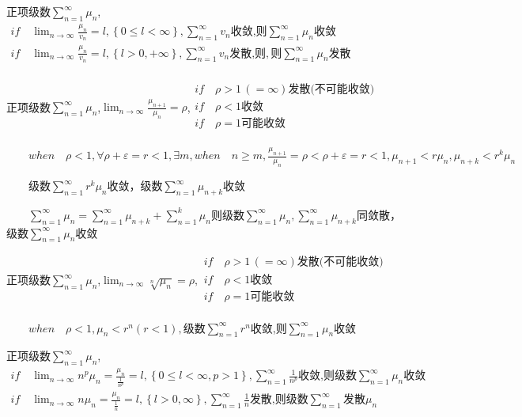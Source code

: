 \documentclass[UTF8]{ctexart}
\newcommand{\mt}[1]{\text{#1}}
\newcommand{\md}[1]{\displaystyle{#1}}
\newcommand{\mda}[1]{$\displaystyle{ #1 }$}
\newcommand{\mf}[1]{\left( #1\right)}
\newcommand{\mfb}[1]{\left\{ #1\right\}}
\newcommand{\q}{\quad}
\newcommand{\ma}[1]{\begin{array}{llll} #1 \end{array}}
\begin{document}
正项级数\mda{\sum_{n=1}^\infty\mu_n},\mda{\ma{
    if \q \lim_{n \rightarrow \infty}\frac{\mu_n}{v_n}=l,\mfb{0\leqslant l < \infty}, {\sum_{n=1}^\infty v_n}\mt{收敛,则} {\sum_{n=1}^\infty \mu_n}\mt{收敛}\\
    if \q \lim_{n \rightarrow \infty}\frac{\mu_n}{v_n}=l,\mfb{l>0,+\infty},{\sum_{n=1}^\infty v_n}\mt{发散,则},则{\sum_{n=1}^\infty \mu_n}\mt{发散}\\
}}

正项级数\mda{\sum_{n=1}^\infty\mu_n},\mda{\lim_{n \rightarrow \infty}\frac{\mu_{n+1}}{\mu_n}=\rho},$\ma{
    if \q \rho >1 \,\mf{=\infty} \mt{发散(不可能收敛)}\\
    if \q \rho <1 \mt{收敛}\\
    if \q \rho =1 \mt{可能收敛}\\
}$



$\q \q when  \q \rho <1 ,\forall \rho + \varepsilon=r<1,\exists m,when \q n\geqslant m,\frac{\mu_{n+1}}{\mu_n}=\rho<\rho+\varepsilon=r<1,{\mu_{n+1}}<r{\mu_n},{\mu_{n+k}}<r^k{\mu_n}$

$\q \q  $级数$\sum_{n=1}^\infty r^k\mu_n$收敛，级数$\sum_{n=1}^\infty \mu_{n+k}$收敛

$\q \q \md{\sum _{n=1}^\infty \mu_n =\sum _{n=1}^\infty \mu_{n+k} + \sum _{n=1}^k\mu_n}$则级数$\sum _{n=1}^\infty \mu_n ,\sum _{n=1}^\infty \mu_{n+k}$同敛散，级数$\sum_{n=1}^\infty \mu_{n}$收敛


正项级数\mda{\sum_{n=1}^\infty\mu_n},\mda{\lim_{n \rightarrow \infty}\sqrt[n]{\mu_n}=\rho,\ma{
    if \q \rho >1 \,\mf{=\infty} \mt{发散(不可能收敛)}\\
    if \q \rho <1 \mt{收敛}\\
    if \q \rho =1 \mt{可能收敛}\\
}}

$\q \q when \q \rho<1,\mu_n < r^n \mf{r<1},\mt{级数}\md{\sum_{n=1}^{ \infty}r^n}$收敛,则\mda{\sum_{n=1}^\infty\mu_n}收敛

正项级数\mda{\sum_{n=1}^\infty\mu_n},\mda{\ma{
    if \q \lim_{n \rightarrow \infty}n^p\mu_n=\frac{\mu_n}{\frac{1}{n^p}}=l,\mfb{0\leqslant l<\infty,p>1} ,\sum_{n=1}^\infty \frac{1}{n^p}  \mt{收敛,则级数} \sum_{n=1}^\infty \mu_n\mt{收敛}\\
    if \q \lim_{n \rightarrow \infty}n\mu_n=\frac{\mu_n}{\frac{1}{n}}=l,\mfb{l>0,\infty} ,\sum_{n=1}^\infty \frac{1}{n} \mt{发散,则级数}\sum_{n=1}^\infty \mt{发散}\mu_n\\
}}
\end{document}
